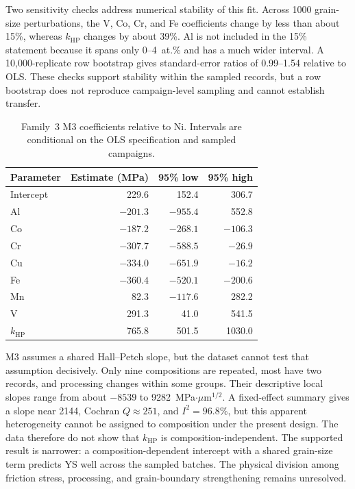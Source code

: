 \documentclass[5p,times,twocolumn]{elsarticle}
\begin{document}
Two sensitivity checks address numerical stability of this fit. Across 1000 grain-size perturbations, the V, Co, Cr, and Fe coefficients change by less than about 15\%, whereas $k_{\mathrm{HP}}$ changes by about 39\%. Al is not included in the 15\% statement because it spans only 0--4~at.\% and has a much wider interval. A 10,000-replicate row bootstrap gives standard-error ratios of 0.99--1.54 relative to OLS. These checks support stability within the sampled records, but a row bootstrap does not reproduce campaign-level sampling and cannot establish transfer.

\begin{table}[t]
\centering
\caption{Family~3 M3 coefficients relative to Ni. Intervals are conditional on the OLS specification and sampled campaigns.}
\label{tab:m3-main}
\footnotesize
\begin{tabular}{lrrr}
\toprule
Parameter & Estimate (MPa) & 95\% low & 95\% high \\
\midrule
Intercept & 229.6 & 152.4 & 306.7 \\
Al & $-201.3$ & $-955.4$ & 552.8 \\
Co & $-187.2$ & $-268.1$ & $-106.3$ \\
Cr & $-307.7$ & $-588.5$ & $-26.9$ \\
Cu & $-334.0$ & $-651.9$ & $-16.2$ \\
Fe & $-360.4$ & $-520.1$ & $-200.6$ \\
Mn & 82.3 & $-117.6$ & 282.2 \\
V & 291.3 & 41.0 & 541.5 \\
$k_{\mathrm{HP}}$ & 765.8 & 501.5 & 1030.0 \\
\bottomrule
\end{tabular}
\end{table}

M3 assumes a shared Hall--Petch slope, but the dataset cannot test that assumption decisively. Only nine compositions are repeated, most have two records, and processing changes within some groups. Their descriptive local slopes range from about $-8539$ to 9282~MPa$\cdot\mu$m$^{1/2}$. A fixed-effect summary gives a slope near 2144, Cochran $Q\approx251$, and $I^2=96.8\%$, but this apparent heterogeneity cannot be assigned to composition under the present design. The data therefore do not show that $k_{\mathrm{HP}}$ is composition-independent. The supported result is narrower: a composition-dependent intercept with a shared grain-size term predicts YS well across the sampled batches. The physical division among friction stress, processing, and grain-boundary strengthening remains unresolved.
\end{document}
